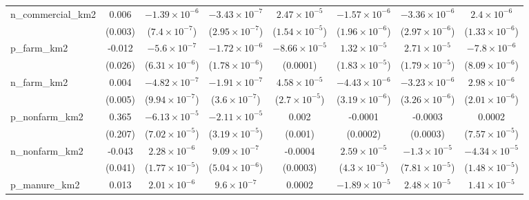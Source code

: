 \begin{table}[htbp]
\begin{tabular}{lccccccc}
      n\_commercial\_km2        & 0.006                   & $-1.39\times 10^{-6}$   & $-3.43\times 10^{-7}$   & $2.47\times 10^{-5}$    & $-1.57\times 10^{-6}$   & $-3.36\times 10^{-6}$   & $2.4\times 10^{-6}$\\    
                                & (0.003)                 & ($7.4\times 10^{-7}$)   & ($2.95\times 10^{-7}$)  & ($1.54\times 10^{-5}$)  & ($1.96\times 10^{-6}$)  & ($2.97\times 10^{-6}$)  & ($1.33\times 10^{-6}$)\\    
      p\_farm\_km2              & -0.012                  & $-5.6\times 10^{-7}$    & $-1.72\times 10^{-6}$   & $-8.66\times 10^{-5}$   & $1.32\times 10^{-5}$    & $2.71\times 10^{-5}$    & $-7.8\times 10^{-6}$\\    
                                & (0.026)                 & ($6.31\times 10^{-6}$)  & ($1.78\times 10^{-6}$)  & (0.0001)                & ($1.83\times 10^{-5}$)  & ($1.79\times 10^{-5}$)  & ($8.09\times 10^{-6}$)\\    
      n\_farm\_km2              & 0.004                   & $-4.82\times 10^{-7}$   & $-1.91\times 10^{-7}$   & $4.58\times 10^{-5}$    & $-4.43\times 10^{-6}$   & $-3.23\times 10^{-6}$   & $2.98\times 10^{-6}$\\    
                                & (0.005)                 & ($9.94\times 10^{-7}$)  & ($3.6\times 10^{-7}$)   & ($2.7\times 10^{-5}$)   & ($3.19\times 10^{-6}$)  & ($3.26\times 10^{-6}$)  & ($2.01\times 10^{-6}$)\\    
      p\_nonfarm\_km2           & 0.365                   & $-6.13\times 10^{-5}$   & $-2.11\times 10^{-5}$   & 0.002                   & -0.0001                 & -0.0003                 & 0.0002\\   
                                & (0.207)                 & ($7.02\times 10^{-5}$)  & ($3.19\times 10^{-5}$)  & (0.001)                 & (0.0002)                & (0.0003)                & ($7.57\times 10^{-5}$)\\    
      n\_nonfarm\_km2           & -0.043                  & $2.28\times 10^{-6}$    & $9.09\times 10^{-7}$    & -0.0004                 & $2.59\times 10^{-5}$    & $-1.3\times 10^{-5}$    & $-4.34\times 10^{-5}$\\    
                                & (0.041)                 & ($1.77\times 10^{-5}$)  & ($5.04\times 10^{-6}$)  & (0.0003)                & ($4.3\times 10^{-5}$)   & ($7.81\times 10^{-5}$)  & ($1.48\times 10^{-5}$)\\    
      p\_manure\_km2            & 0.013                   & $2.01\times 10^{-6}$    & $9.6\times 10^{-7}$     & 0.0002                  & $-1.89\times 10^{-5}$   & $2.48\times 10^{-5}$    & $1.41\times 10^{-5}$\\    

\end{tabular}
\end{table}

